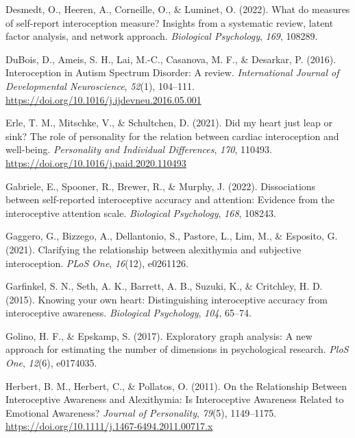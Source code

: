 \documentclass[
  man,
  floatsintext,
  longtable,
  nolmodern,
  notxfonts,
  notimes,
  colorlinks=true,linkcolor=blue,citecolor=blue,urlcolor=blue]{apa7}
\newlength{\cslhangindent}
\newenvironment{CSLReferences}[2] %
 {\begin{list}{}{%
  \setlength{\itemindent}{0pt}
  \setlength{\leftmargin}{0pt}
  \setlength{\parsep}{0pt}
  \ifodd #1
   \setlength{\leftmargin}{\cslhangindent}
   \setlength{\itemindent}{-1\cslhangindent}
  \fi
  \setlength{\itemsep}{#2\baselineskip}}}
 {\end{list}}
\begin{document}
\begin{CSLReferences}{1}{0}
Desmedt, O., Heeren, A., Corneille, O., \& Luminet, O. (2022). What do
measures of self-report interoception measure? Insights from a
systematic review, latent factor analysis, and network approach.
\emph{Biological Psychology}, \emph{169}, 108289.

DuBois, D., Ameis, S. H., Lai, M.-C., Casanova, M. F., \& Desarkar, P.
(2016). Interoception in Autism Spectrum Disorder: A review.
\emph{International Journal of Developmental Neuroscience},
\emph{52}(1), 104--111.
\url{https://doi.org/10.1016/j.ijdevneu.2016.05.001}

Erle, T. M., Mitschke, V., \& Schultchen, D. (2021). Did my heart just
leap or sink? The role of personality for the relation between cardiac
interoception and well-being. \emph{Personality and Individual
Differences}, \emph{170}, 110493.
\url{https://doi.org/10.1016/j.paid.2020.110493}

Gabriele, E., Spooner, R., Brewer, R., \& Murphy, J. (2022).
Dissociations between self-reported interoceptive accuracy and
attention: Evidence from the interoceptive attention scale.
\emph{Biological Psychology}, \emph{168}, 108243.

Gaggero, G., Bizzego, A., Dellantonio, S., Pastore, L., Lim, M., \&
Esposito, G. (2021). Clarifying the relationship between alexithymia and
subjective interoception. \emph{PLoS One}, \emph{16}(12), e0261126.

Garfinkel, S. N., Seth, A. K., Barrett, A. B., Suzuki, K., \& Critchley,
H. D. (2015). Knowing your own heart: Distinguishing interoceptive
accuracy from interoceptive awareness. \emph{Biological Psychology},
\emph{104}, 65--74.

Golino, H. F., \& Epskamp, S. (2017). Exploratory graph analysis: A new
approach for estimating the number of dimensions in psychological
research. \emph{PloS One}, \emph{12}(6), e0174035.

Herbert, B. M., Herbert, C., \& Pollatos, O. (2011). On the Relationship
Between Interoceptive Awareness and Alexithymia: Is Interoceptive
Awareness Related to Emotional Awareness? \emph{Journal of Personality},
\emph{79}(5), 1149--1175.
\url{https://doi.org/10.1111/j.1467-6494.2011.00717.x}


\end{CSLReferences}
\end{document}
